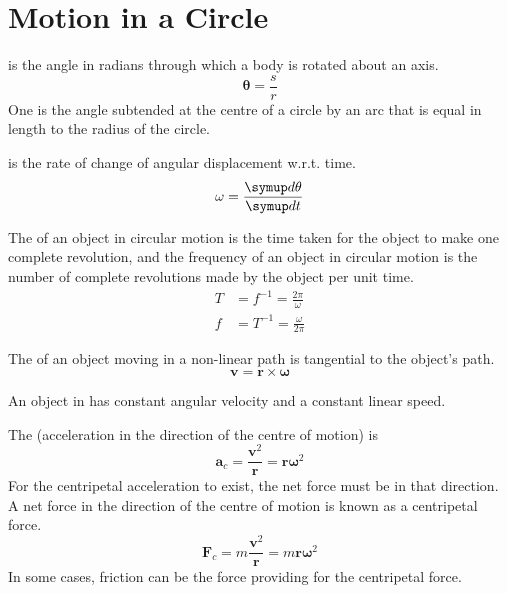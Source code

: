 \documentclass[Physics.tex]{subfiles}
\begin{document}
\chapter{Motion in a Circle}
 is the angle in radians through which a body is rotated about an axis. \begin{equation}\mathbf{\theta} = \frac{s}{r}\end{equation} One  is the angle subtended at the centre of a circle by an arc that is equal in length to the radius of the circle.

 is the rate of change of angular displacement w.r.t. time. \begin{equation}\mathbf{\omega} = \sldd{\mathbf{\theta}}{t}\end{equation}

The  of an object in circular motion is the time taken for the object to make one complete revolution, and the frequency of an object in circular motion is the number of complete revolutions made by the object per unit time. \begin{align}T &= f^{-1} = \frac{2\pi}{\omega}\\f &= T^{-1} = \frac{\omega}{2\pi}\end{align}

The  of an object moving in a non-linear path is tangential to the object's path. \begin{equation}\mathbf{v} = \mathbf{r} \times \mathbf{\omega}\end{equation}

An object in  has constant angular velocity and a constant linear speed.

The  (acceleration in the direction of the centre of motion) is \begin{equation}\mathbf{a}_c = \frac{\mathbf{v}^2}{\mathbf{r}} = \mathbf{r\omega}^2\end{equation} For the centripetal acceleration to exist, the net force must be in that direction. A net force in the direction of the centre of motion is known as a centripetal force. \begin{equation}\mathbf{F}_c = m\frac{\mathbf{v}^2}{\mathbf{r}} = m\mathbf{r\omega}^2\end{equation} In some cases, friction can be the force providing for the centripetal force.
\end{document}
